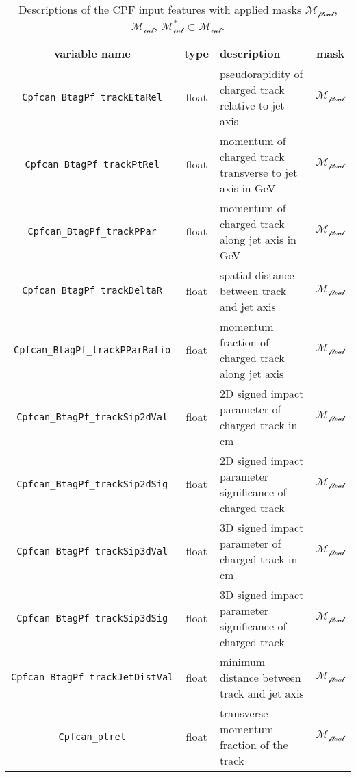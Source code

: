 \begin{table}[ht]
\centering
\caption{Descriptions of the CPF input features with applied masks $\mathcal{M_{\text{float}}}$, $\mathcal{M_{\text{int}}}$, $\mathcal{M_{\text{int}}^*\subset M_{\text{int}}}$.}
\begin{tabularx}{\textwidth}{|c|c|X|c|}
\hline
\textbf{variable name} & \textbf{type} & \textbf{description} & \textbf{mask} \\
\hline
\texttt{Cpfcan\_BtagPf\_trackEtaRel} & float & pseudorapidity of charged track relative to jet axis & \cellcolor{green!50}$\mathcal{M_{\text{float}}}$ \\
\hline
\texttt{Cpfcan\_BtagPf\_trackPtRel} & float & momentum of charged track transverse to jet axis in GeV & \cellcolor{green!50}$\mathcal{M_{\text{float}}}$ \\
\hline
\texttt{Cpfcan\_BtagPf\_trackPPar} & float & momentum of charged track along jet axis in GeV & \cellcolor{green!50}$\mathcal{M_{\text{float}}}$ \\
\hline
\texttt{Cpfcan\_BtagPf\_trackDeltaR} & float & spatial distance between track and jet axis & \cellcolor{green!50}$\mathcal{M_{\text{float}}}$ \\
\hline
\texttt{Cpfcan\_BtagPf\_trackPParRatio} & float & momentum fraction of charged track along jet axis & \cellcolor{green!50}$\mathcal{M_{\text{float}}}$ \\
\hline
\texttt{Cpfcan\_BtagPf\_trackSip2dVal} & float & 2D signed impact parameter of charged track in cm & \cellcolor{green!50}$\mathcal{M_{\text{float}}}$ \\
\hline
\texttt{Cpfcan\_BtagPf\_trackSip2dSig} & float & 2D signed impact parameter significance of charged track & \cellcolor{green!50}$\mathcal{M_{\text{float}}}$ \\
\hline
\texttt{Cpfcan\_BtagPf\_trackSip3dVal} & float & 3D signed impact parameter of charged track in cm & \cellcolor{green!50}$\mathcal{M_{\text{float}}}$ \\
\hline
\texttt{Cpfcan\_BtagPf\_trackSip3dSig} & float & 3D signed impact parameter significance of charged track & \cellcolor{green!50}$\mathcal{M_{\text{float}}}$ \\
\hline
\texttt{Cpfcan\_BtagPf\_trackJetDistVal} & float & minimum distance between track and jet axis & \cellcolor{green!50}$\mathcal{M_{\text{float}}}$ \\
\hline
\texttt{Cpfcan\_ptrel} & float & transverse momentum fraction of the track & \cellcolor{green!50}$\mathcal{M_{\text{float}}}$ \\

\end{tabularx}
\end{table}
